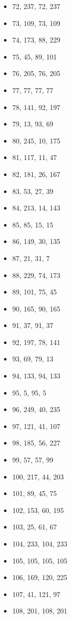 \documentclass[12pt, fleqn]{report}                             %
\theoremstyle{break}                                            %
\begin{document}
\begin{multicols}{3}
\begin{itemize}
        \item 72, 237, 72, 237
        \item 73, 109, 73, 109
        \item 74, 173, 88, 229
        \item 75, 45, 89, 101
        \item 76, 205, 76, 205
        \item 77, 77, 77, 77
        \item 78, 141, 92, 197
        \item 79, 13, 93, 69
        \item 80, 245, 10, 175
        \item 81, 117, 11, 47
        \item 82, 181, 26, 167
        \item 83, 53, 27, 39
        \item 84, 213, 14, 143
        \item 85, 85, 15, 15
        \item 86, 149, 30, 135
        \item 87, 21, 31, 7
        \item 88, 229, 74, 173
        \item 89, 101, 75, 45
        \item 90, 165, 90, 165
        \item 91, 37, 91, 37
        \item 92, 197, 78, 141
        \item 93, 69, 79, 13
        \item 94, 133, 94, 133
        \item 95, 5, 95, 5
        \item 96, 249, 40, 235
        \item 97, 121, 41, 107
        \item 98, 185, 56, 227
        \item 99, 57, 57, 99
        \item 100, 217, 44, 203
        \item 101, 89, 45, 75
        \item 102, 153, 60, 195
        \item 103, 25, 61, 67
        \item 104, 233, 104, 233
        \item 105, 105, 105, 105
        \item 106, 169, 120, 225
        \item 107, 41, 121, 97
        \item 108, 201, 108, 201

\end{itemize}
\end{multicols}
\end{document}
